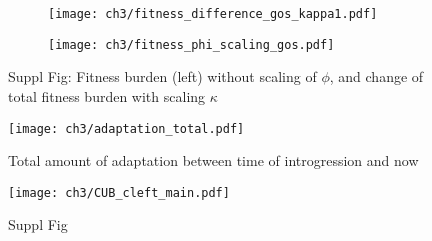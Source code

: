 \begin{figure}[h]
    \centering
    \begin{subfigure}
        \centering
        \texttt{[image: ch3/fitness\_difference\_gos\_kappa1.pdf]}
    \end{subfigure}
    \begin{subfigure}
        \centering
        \texttt{[image: ch3/fitness\_phi\_scaling\_gos.pdf]}
    \end{subfigure}
    \caption{Suppl Fig: Fitness burden (left) without scaling of $\phi$, and change of total fitness burden with scaling $\kappa$}
    \label{fig:sne_scaling}
\end{figure}

\begin{figure}[H]
     \centering
	\texttt{[image: ch3/adaptation\_total.pdf]}
	\caption{Total amount of adaptation between time of introgression and now}
	\label{fig:adapt_tot}
\end{figure}

\clearpage
\begin{figure}[H]
     \centering
	\texttt{[image: ch3/CUB\_cleft\_main.pdf]}
	\caption{Suppl Fig}
	\label{fig:cub_all_sets}
\end{figure}


